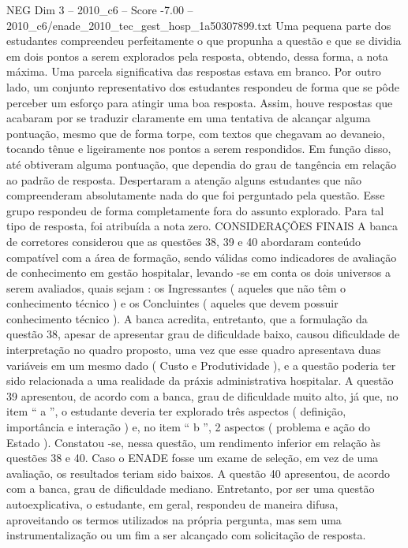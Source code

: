 \begin{textsample}{NEG Dim 3 – 2010\_c6 – Score -7.00 – 2010\_c6/enade\_2010\_tec\_gest\_hosp\_1a50307899.txt}
Uma pequena parte dos estudantes compreendeu perfeitamente o que propunha a questão e que se dividia em dois pontos a serem explorados pela resposta, obtendo, dessa forma, a nota máxima.
Uma parcela significativa das respostas estava em branco.
Por outro lado, um conjunto representativo dos estudantes respondeu de forma que se pôde perceber um esforço para atingir uma boa resposta.
Assim, houve respostas que acabaram por se traduzir claramente em uma tentativa de alcançar alguma pontuação, mesmo que de forma torpe, com textos que chegavam ao devaneio, tocando tênue e ligeiramente nos pontos a serem respondidos.
Em função disso, até obtiveram alguma pontuação, que dependia do grau de tangência em relação ao padrão de resposta.
Despertaram a atenção alguns estudantes que não compreenderam absolutamente nada do que foi perguntado pela questão.
Esse grupo respondeu de forma completamente fora do assunto explorado.
Para tal tipo de resposta, foi atribuída a nota zero.
CONSIDERAÇÕES FINAIS A banca de corretores considerou que as questões 38, 39 e 40 abordaram conteúdo compatível com a área de formação, sendo válidas como indicadores de avaliação de conhecimento em gestão hospitalar, levando -se em conta os dois universos a serem avaliados, quais sejam : os Ingressantes ( aqueles que não têm o conhecimento técnico ) e os Concluintes ( aqueles que devem possuir conhecimento técnico ).
A banca acredita, entretanto, que a formulação da questão 38, apesar de apresentar grau de dificuldade baixo, causou dificuldade de interpretação no quadro proposto, uma vez que esse quadro apresentava duas variáveis em um mesmo dado ( Custo e Produtividade ), e a questão poderia ter sido relacionada a uma realidade da práxis administrativa hospitalar.
A questão 39 apresentou, de acordo com a banca, grau de dificuldade muito alto, já que, no item “ a ”, o estudante deveria ter explorado três aspectos ( definição, importância e interação ) e, no item “ b ”, 2 aspectos ( problema e ação do Estado ).
Constatou -se, nessa questão, um rendimento inferior em relação às questões 38 e 40.
Caso o ENADE fosse um exame de seleção, em vez de uma avaliação, os resultados teriam sido baixos.
A questão 40 apresentou, de acordo com a banca, grau de dificuldade mediano.
Entretanto, por ser uma questão autoexplicativa, o estudante, em geral, respondeu de maneira difusa, aproveitando os termos utilizados na própria pergunta, mas sem uma instrumentalização ou um fim a ser alcançado com solicitação de resposta.

\end{textsample}
